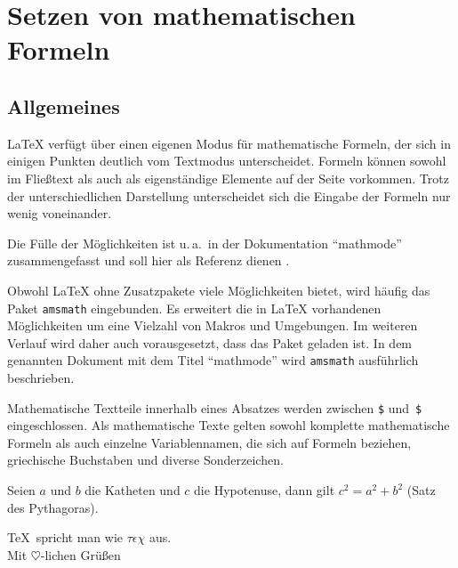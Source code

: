 

\section{Setzen von mathematischen Formeln} \label{math}


\subsection{Allgemeines}

\LaTeX{} verfügt über einen eigenen Modus für mathematische Formeln, der sich
in einigen Punkten deutlich vom Textmodus unterscheidet. Formeln können sowohl
im Fließtext als auch als eigenständige Elemente auf der Seite vorkommen.
Trotz der unterschiedlichen Darstellung  unterscheidet sich die Eingabe der
Formeln nur wenig voneinander.

Die Fülle der Möglichkeiten ist u.\,a.\ in der Dokumentation \enquote{mathmode}
zusammengefasst und soll hier als Referenz dienen \cite{mathmode}.

Obwohl \LaTeX{} ohne Zusatzpakete viele Möglichkeiten bietet, wird häufig
das Paket \texttt{amsmath} eingebunden. Es erweitert die in \LaTeX{}
vorhandenen Möglichkeiten  um eine Vielzahl von Makros und Umgebungen. Im
weiteren Verlauf wird daher auch vorausgesetzt, dass das Paket geladen ist. In
dem genannten Dokument mit dem Titel \enquote{mathmode} wird \texttt{amsmath}
ausführlich beschrieben.

Mathematische Textteile innerhalb eines Absatzes werden zwischen \lstinline|$| und~\lstinline|$| eingeschlossen.
Als mathematische Texte gelten sowohl komplette mathematische
Formeln als auch einzelne Variablennamen, die sich auf Formeln
beziehen, griechische Buchstaben und diverse Sonderzeichen.

\begin{LTXexample}
Seien $a$ und $b$ die Katheten
und $c$ die Hypotenuse,
dann gilt $c^{2}=a^{2}+b^{2}$
(Satz des Pythagoras).
\end{LTXexample}

\begin{LTXexample}
\TeX\ spricht man wie
 $\tau\epsilon\chi$ aus.\\
Mit $\heartsuit$-lichen
 Grü\ss en
\end{LTXexample}


